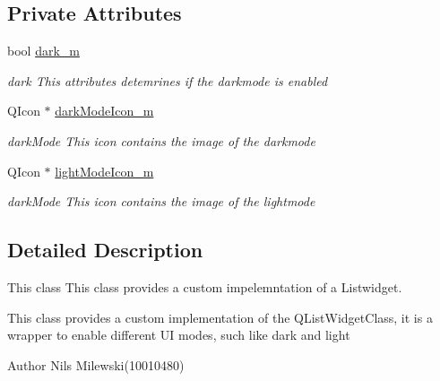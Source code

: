 \subsection*{Private Attributes}
\begin{DoxyCompactItemize}
\item 
\mbox{\label{classui_1_1custom_u_i_1_1_custom_list_widget_item_ac82e362c36815072e8927cd2b5f6011f}} 
bool \mbox{\hyperlink{classui_1_1custom_u_i_1_1_custom_list_widget_item_ac82e362c36815072e8927cd2b5f6011f}{dark\+\_\+m}}
\begin{DoxyCompactList}\small\item\em dark This attributes detemrines if the darkmode is enabled \end{DoxyCompactList}\item 
\mbox{\label{classui_1_1custom_u_i_1_1_custom_list_widget_item_a62ba044883f9b0a2a1abc6e13efb3411}} 
Q\+Icon $\ast$ \mbox{\hyperlink{classui_1_1custom_u_i_1_1_custom_list_widget_item_a62ba044883f9b0a2a1abc6e13efb3411}{dark\+Mode\+Icon\+\_\+m}}
\begin{DoxyCompactList}\small\item\em dark\+Mode This icon contains the image of the darkmode \end{DoxyCompactList}\item 
\mbox{\label{classui_1_1custom_u_i_1_1_custom_list_widget_item_a26296177f28c453439f056d550fe9c81}} 
Q\+Icon $\ast$ \mbox{\hyperlink{classui_1_1custom_u_i_1_1_custom_list_widget_item_a26296177f28c453439f056d550fe9c81}{light\+Mode\+Icon\+\_\+m}}
\begin{DoxyCompactList}\small\item\em dark\+Mode This icon contains the image of the lightmode \end{DoxyCompactList}\end{DoxyCompactItemize}


\subsection{Detailed Description}
This class This class provides a custom impelemntation of a Listwidget. 

This class provides a custom implementation of the Q\+List\+Widget\+Class, it is a wrapper to enable different UI modes, such like dark and light \begin{DoxyAuthor}{Author}
Nils Milewski(10010480) 
\end{DoxyAuthor}


